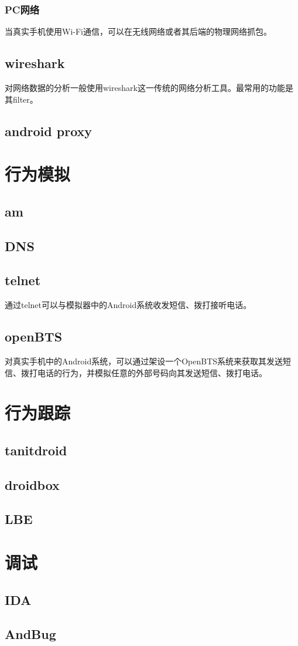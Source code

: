 \subsubsection{PC网络}
当真实手机使用Wi-Fi通信，可以在无线网络或者其后端的物理网络抓包。
\subsection{wireshark}
对网络数据的分析一般使用wireshark这一传统的网络分析工具。最常用的功能是其filter。

\subsection{android proxy}
\section{行为模拟}
\subsection{am}

\subsection{DNS}

\subsection{telnet}
通过telnet可以与模拟器中的Android系统收发短信、拨打接听电话。
\subsection{openBTS}
对真实手机中的Android系统，可以通过架设一个OpenBTS系统来获取其发送短信、拨打电话的行为，并模拟任意的外部号码向其发送短信、拨打电话。

\section{行为跟踪}
\subsection{tanitdroid}
\subsection{droidbox}
\subsection{LBE}

\section{调试}
\subsection{IDA}
\subsection{AndBug}